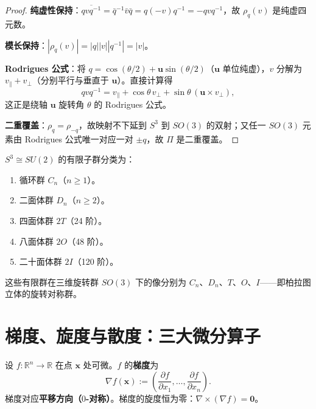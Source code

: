 \begin{proof}
\textbf{纯虚性保持}：$\overline{qvq^{-1}} = \bar q^{-1} \bar v \bar q = q(-v)q^{-1} = -qvq^{-1}$，故 $\rho_q(v)$ 是纯虚四元数。

\textbf{模长保持}：$|\rho_q(v)| = |q||v||q^{-1}| = |v|$。

\textbf{Rodrigues 公式}：将 $q = \cos(\theta/2) + \mathbf{u}\sin(\theta/2)$（$\mathbf{u}$ 单位纯虚），$v$ 分解为 $v_\parallel + v_\perp$（分别平行与垂直于 $\mathbf{u}$）。直接计算得
\[
qvq^{-1} = v_\parallel + \cos\theta\,v_\perp + \sin\theta\,(\mathbf{u}\times v_\perp),
\]
这正是绕轴 $\mathbf{u}$ 旋转角 $\theta$ 的 Rodrigues 公式。

\textbf{二重覆盖}：$\rho_q = \rho_{-q}$，故映射不下延到 $S^3$ 到 $SO(3)$ 的双射；又任一 $SO(3)$ 元素由 Rodrigues 公式唯一对应一对 $\pm q$，故 $\Pi$ 是二重覆盖。
\end{proof}

\begin{property}[单位四元数群的子群分类]\label{prop:quaternion_finite_subgroups}
$S^3 \cong SU(2)$ 的有限子群分类为：
\begin{enumerate}[label=(\roman*)]
    \item 循环群 $C_n$（$n \ge 1$）。
    \item 二面体群 $D_n$（$n \ge 2$）。
    \item 四面体群 $2T$（24 阶）。
    \item 八面体群 $2O$（48 阶）。
    \item 二十面体群 $2I$（120 阶）。
\end{enumerate}
这些有限群在三维旋转群 $SO(3)$ 下的像分别为 $C_n$、$D_n$、$T$、$O$、$I$——即柏拉图立体的旋转对称群。
\end{property}

\section{梯度、旋度与散度：三大微分算子}\label{sec:three_operators}
\label{sec:grad_curl_div}

\begin{definition}[梯度]\label{def:gradient}
设 $f: \mathbb{R}^n \to \mathbb{R}$ 在点 $\mathbf{x}$ 处可微。$f$ 的\textbf{梯度}为
\[
\nabla f(\mathbf{x}) := \left( \frac{\partial f}{\partial x_1}, \dots, \frac{\partial f}{\partial x_n} \right).
\]
梯度对应\textbf{平移方向（$0$-对称）}。梯度的旋度恒为零：$\nabla \times (\nabla f) = \mathbf{0}$。
\end{definition}

